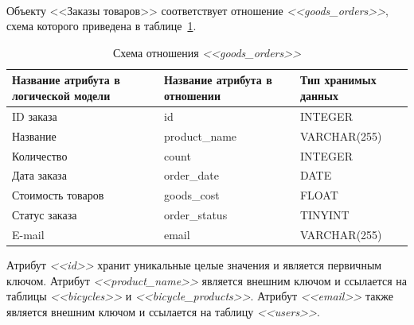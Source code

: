 \paragraph{}
Объекту <<Заказы товаров>> соответствует отношение \textit{<<goods\_orders>>}, схема которого приведена в
таблице~\ref{tbl:goods_orders_scheme}.
\begin{table}[h!]
  \caption{Схема отношения \textit{<<goods\_orders>>}}
  \label{tbl:goods_orders_scheme}
  \small{
    \centering
    \begin{tabular}{| p{} | p{} | p{} |}
      \hline
      Название атрибута в \newline логической модели &
      Название атрибута в \newline отношении &
      Тип хранимых данных \\

      \hline
      ID заказа & id & INTEGER \\

      \hline
      Название & product\_name & VARCHAR(255) \\

      \hline
      Количество & count & INTEGER \\

      \hline
      Дата заказа & order\_date & DATE \\

      \hline
      Стоимость товаров & goods\_cost & FLOAT \\

      \hline
      Статус заказа & order\_status & TINYINT \\

      \hline
      E-mail & email & VARCHAR(255) \\

      \hline
    \end{tabular}
  }
\end{table}

Атрибут \textit{<<id>>} хранит уникальные целые значения и является первичным ключом.
Атрибут \textit{<<product\_name>>} является внешним ключом
и ссылается на таблицы \textit{<<bicycles>>} и \textit{<<bicycle\_products>>}.
Атрибут \textit{<<email>>} также является внешним ключом и ссылается
на таблицу \textit{<<users>>}.

